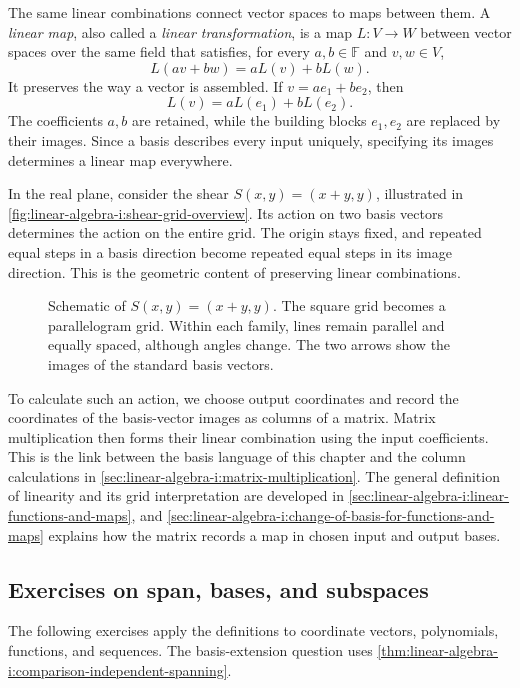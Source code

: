 The same linear combinations connect vector spaces to maps between them.
A \emph{linear map}, also called a \emph{linear transformation}, is a map
\(L:V\to W\) between vector spaces over the same field that satisfies,
for every \(a,b\in\mathbb F\) and \(v,w\in V\),
\[
  L(av+bw)=aL(v)+bL(w).
\]
It preserves the way a vector is assembled. If \(v=ae_1+be_2\), then
\[
  L(v)=aL(e_1)+bL(e_2).
\]
The coefficients \(a,b\) are retained, while the building blocks
\(e_1,e_2\) are replaced by their images. Since a basis describes every
input uniquely, specifying its images determines a linear map everywhere.

In the real plane, consider the shear \(S(x,y)=(x+y,y)\), illustrated in
\autoref{fig:linear-algebra-i:shear-grid-overview}. Its action on two
basis vectors determines the action on the entire grid. The origin stays
fixed, and repeated equal steps in a basis direction become repeated equal
steps in its image direction. This is the geometric content of preserving
linear combinations.
\begin{figure}[htbp]
  \centering
  
  \caption[A grid under a shear]{Schematic of \(S(x,y)=(x+y,y)\).
    The square grid becomes a parallelogram grid. Within each family,
    lines remain parallel and equally spaced, although angles change.
    The two arrows show the images of the standard basis vectors.}
  \label{fig:linear-algebra-i:shear-grid-overview}
\end{figure}

To calculate such an action, we choose output coordinates and record the
coordinates of the basis-vector images as columns of a matrix.
Matrix multiplication then forms their linear
combination using the input coefficients. This is the link between the
basis language of this chapter and the column calculations in
\autoref{sec:linear-algebra-i:matrix-multiplication}.
The general definition of linearity and its grid interpretation are developed
in \autoref{sec:linear-algebra-i:linear-functions-and-maps}, and
\autoref{sec:linear-algebra-i:change-of-basis-for-functions-and-maps}
explains how the matrix records a map in chosen input and output bases.

\subsection{Exercises on span, bases, and subspaces}

The following exercises apply the definitions to coordinate vectors,
polynomials, functions, and sequences. The basis-extension question
uses \autoref{thm:linear-algebra-i:comparison-independent-spanning}.

